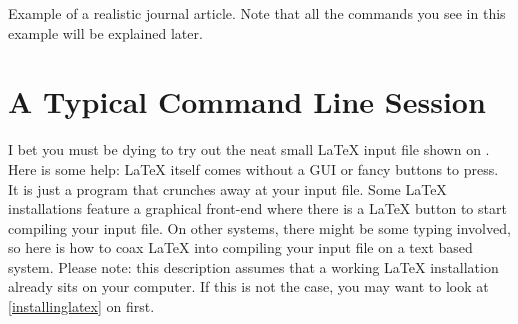 \begin{listing}
  \begin{lined}{\textwidth}
  \end{lined}
  \caption[Example of a realistic journal article.]{Example of a realistic
    journal article. Note that all the commands you see in this example will be
    explained later.}\label{document}
\end{listing}

\section{A Typical Command Line Session}

I bet you must be dying to try out the neat small \LaTeX{} input file shown on
. Here is some help: \LaTeX{} itself comes without a GUI or
fancy buttons to press. It is just a program that crunches away at your input
file. Some \LaTeX{} installations feature a graphical front-end where there is
a \LaTeX{} button to start compiling your input file. On other systems, there
might be some typing involved, so here is how to coax \LaTeX{} into compiling
your input file on a text based system. Please note: this description assumes
that a working \LaTeX{} installation already sits on your computer. If this is
not the case, you may want to look at \autoref{installinglatex} on
 first.

